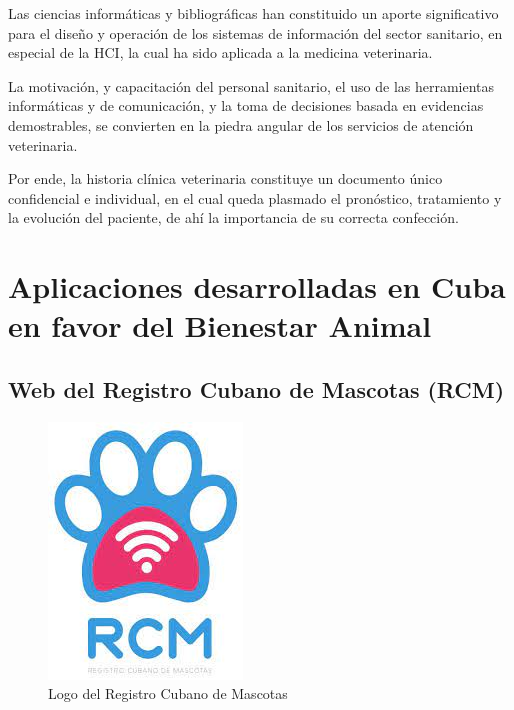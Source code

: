 Las ciencias informáticas y bibliográficas han constituido un aporte significativo para el diseño y operación de los sistemas de información del sector sanitario, en especial de la HCI, la cual ha sido aplicada a la medicina veterinaria.

La motivación, y capacitación del personal sanitario, el uso de las herramientas informáticas y de comunicación, y la toma de decisiones basada en evidencias demostrables, se convierten en la piedra angular de los servicios de atención veterinaria.

Por ende, la historia clínica veterinaria constituye un documento único confidencial e individual, en el cual queda plasmado el pronóstico, tratamiento y la evolución del paciente, de ahí la importancia de su correcta confección. 
	

\newpage
\section{Aplicaciones desarrolladas en Cuba en favor del Bienestar Animal}\label{chapter:introduction}

\subsection{Web del Registro Cubano de Mascotas (RCM)}\label{chapter:introduction}


\begin{figure}[h!]
\begin{center}
\includegraphics[scale=0.4]{Graphics/images/LogodelRegistroCubanodeMascotas.jpg}
\caption{Logo del Registro Cubano de Mascotas}
\label{fig:rcm}

\end{center}
\end{figure}


